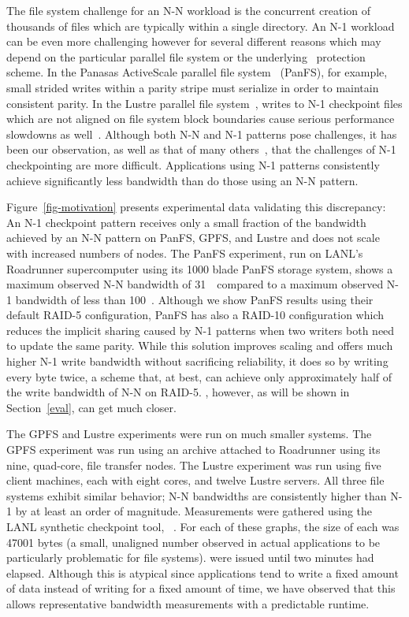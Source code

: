 The file system challenge for an N-N workload is the concurrent creation of
thousands of files which are typically within a single directory.  An N-1
workload can be even more challenging however for several different reasons
which may depend on the particular parallel file system or the underlying
\RAID\ protection scheme.  In the Panasas ActiveScale parallel
file system~\cite{Welch04managingscalability} (PanFS), for example, small strided
writes within a parity stripe must serialize in order to maintain consistent
parity.  In the Lustre parallel file system~\cite{lustre}, writes to N-1
checkpoint files which are not aligned on file system block boundaries cause
serious performance slowdowns as well~\cite{nersc}.  Although both
N-N and N-1 patterns pose challenges, it has been our observation, as well
as that of many others~\cite{grider-hec,adios,nersc,zest,Thakur99datasieving},
that the challenges of N-1 checkpointing are more difficult. 
Applications using N-1 patterns consistently achieve significantly less
bandwidth than do those using an N-N pattern. 



Figure~\ref{fig-motivation} presents experimental data validating this
discrepancy: An N-1 checkpoint pattern receives only a small fraction of the
bandwidth achieved by an N-N pattern on PanFS, GPFS, and Lustre and does not
scale with increased numbers of nodes.  The PanFS experiment, run on LANL's
Roadrunner supercomputer using its 1000 blade PanFS storage system, shows a
maximum observed N-N bandwidth of 31~\GBs\ compared to a maximum observed N-1
bandwidth of less than 100~\MBs.  Although we show PanFS results using their
default RAID-5 configuration, PanFS has also a RAID-10 configuration which
reduces the implicit sharing caused by N-1 patterns when two writers both need
to update the same parity.  While this solution improves scaling and offers
much higher N-1 write bandwidth without sacrificing reliability, it does so by
writing every byte twice, a scheme that, at best, can achieve only
approximately half of the write bandwidth of N-N on RAID-5.  \plfs, however, as
will be shown in Section~\ref{eval}, can get much closer.

The GPFS and Lustre experiments were run on much smaller systems. The GPFS
experiment was run using an archive attached to Roadrunner using its 
nine, quad-core, file transfer nodes.  The Lustre experiment was run using five
client machines, each with eight cores, and twelve Lustre servers.  All three
file systems exhibit similar behavior; N-N bandwidths are consistently higher
than N-1 by at least an order of magnitude.  Measurements were gathered using
the LANL synthetic checkpoint tool, ~\cite{mpi-io-test}.
For each of these graphs, the size of each  was
47001 bytes (a small, unaligned number observed in actual applications to be
particularly problematic for file systems).  were
issued until two minutes had elapsed. Although this is atypical since 
applications tend to write a fixed amount of data instead of writing for
a fixed amount of time, we have observed that this allows representative 
bandwidth measurements with a predictable runtime. 

